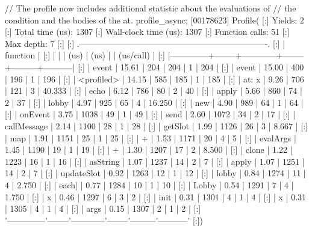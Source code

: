 \begin{urbiscript}
// The profile now includes additional statistic about the evaluations of
// the condition and the bodies of the at.
profile_async;
[00178623] Profile(
[:]  Yields:                    2
[:]  Total time (us):        1307
[:]  Wall-clock time (us):   1307
[:]  Function calls:           51
[:]  Max depth:                 7
[:]
[:]  .-------------------------------------------------------------------.
[:]  |   function   |   %
[:]  |              |        |    (us)    |  (us)  |         | (us/call) |
[:]  |--------------+--------+------------+--------+---------+-----------|
[:]  |        event |  15.61 |        204 |    204 |       1 |       204 |
[:]  |        event |  15.00 |        400 |    196 |       1 |       196 |
[:]  |   <profiled> |  14.15 |        585 |    185 |       1 |       185 |
[:]  |    at: { x } |   9.26 |        706 |    121 |       3 |    40.333 |
[:]  |         echo |   6.12 |        786 |     80 |       2 |        40 |
[:]  |        apply |   5.66 |        860 |     74 |       2 |        37 |
[:]  |        lobby |   4.97 |        925 |     65 |       4 |    16.250 |
[:]  |          new |   4.90 |        989 |     64 |       1 |        64 |
[:]  |      onEvent |   3.75 |       1038 |     49 |       1 |        49 |
[:]  |         send |   2.60 |       1072 |     34 |       2 |        17 |
[:]  |  callMessage |   2.14 |       1100 |     28 |       1 |        28 |
[:]  |      getSlot |   1.99 |       1126 |     26 |       3 |     8.667 |
[:]  |          map |   1.91 |       1151 |     25 |       1 |        25 |
[:]  |            + |   1.53 |       1171 |     20 |       4 |         5 |
[:]  |     evalArgs |   1.45 |       1190 |     19 |       1 |        19 |
[:]  |            + |   1.30 |       1207 |     17 |       2 |     8.500 |
[:]  |        clone |   1.22 |       1223 |     16 |       1 |        16 |
[:]  |     asString |   1.07 |       1237 |     14 |       2 |         7 |
[:]  |        apply |   1.07 |       1251 |     14 |       2 |         7 |
[:]  |   updateSlot |   0.92 |       1263 |     12 |       1 |        12 |
[:]  |        lobby |   0.84 |       1274 |     11 |       4 |     2.750 |
[:]  |        each| |   0.77 |       1284 |     10 |       1 |        10 |
[:]  |        Lobby |   0.54 |       1291 |      7 |       4 |     1.750 |
[:]  |            x |   0.46 |       1297 |      6 |       3 |         2 |
[:]  |         init |   0.31 |       1301 |      4 |       1 |         4 |
[:]  |            x |   0.31 |       1305 |      4 |       1 |         4 |
[:]  |         args |   0.15 |       1307 |      2 |       1 |         2 |
[:]  '--------------'--------'------------'--------'---------'-----------'
[:])
\end{urbiscript}

